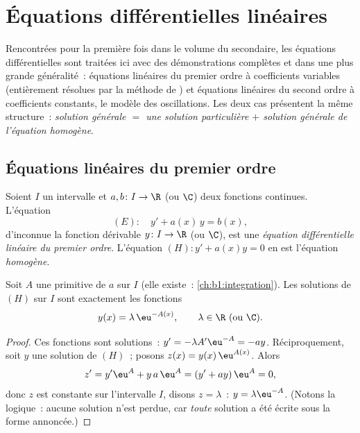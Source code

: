 \chapter{Équations différentielles linéaires}\label{ch:b1:diffeq}

Rencontrées pour la première fois dans le volume du secondaire, les
équations différentielles sont traitées ici avec des démonstrations
complètes et dans une plus grande généralité~: équations linéaires du
premier ordre à coefficients variables (entièrement résolues par la
méthode de ) et équations linéaires du second
ordre à coefficients constants, le modèle des oscillations. Les deux
cas présentent la même structure~: \emph{solution générale $=$ une
solution particulière $+$ solution générale de l'équation homogène}.

\section{Équations linéaires du premier ordre}

\begin{definition}\label{def:b1:diffeq:linear1}
Soient $I$ un intervalle et $a, b \colon I \to \R$ (ou $\C$) deux
fonctions continues. L'équation
\[
(E)\colon\quad y' + a(x)\,y = b(x),
\]
d'inconnue la fonction dérivable $y \colon I \to \R$ (ou $\C$), est
une \emph{équation différentielle linéaire du premier
ordre}.
L'équation $(H)\colon y' + a(x) y = 0$ en est l'équation
\emph{homogène}.
\end{definition}

\begin{theorem}\label{thm:b1:diffeq:homogeneous1}
Soit $A$ une primitive de $a$ sur $I$ (elle existe~:
\cref{ch:b1:integration}). Les solutions de $(H)$ sur $I$ sont
exactement les fonctions
\[
y(x) = \lambda\, \eu^{-A(x)}, \qquad \lambda \in \R \text{ (ou } \C).
\]
\end{theorem}

\begin{proof}
Ces fonctions sont solutions~: $y' = -\lambda A' \eu^{-A} = -a y$.
Réciproquement, soit $y$ une solution de $(H)$~; posons $z(x) = y(x)\,
\eu^{A(x)}$. Alors
\[
z' = y' \eu^{A} + y\, a\, \eu^{A} = (y' + ay)\, \eu^{A} = 0 ,
\]
donc $z$ est constante sur l'intervalle $I$, disons $z = \lambda$~: $y
= \lambda \eu^{-A}$. (Notons la logique~: aucune solution n'est
perdue, car \emph{toute} solution a été écrite sous la forme
annoncée.)
\end{proof}

